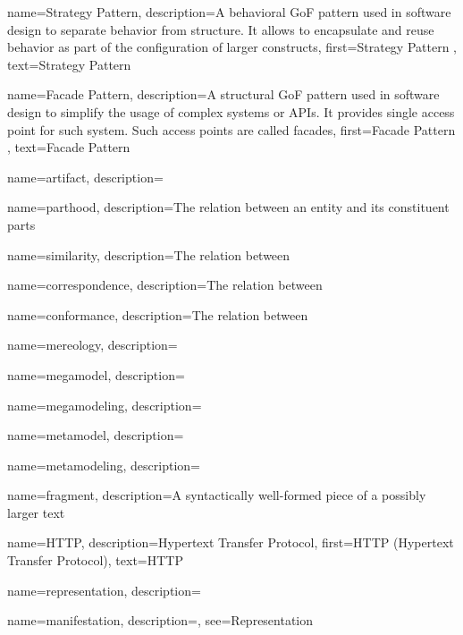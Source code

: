 {
    name={Strategy Pattern},
    description={A behavioral \gls{GoF} pattern used in software design to separate behavior from structure. It allows to encapsulate and reuse behavior as part of the configuration of larger constructs},
    first={Strategy Pattern \cite{Gamma:1995:DPE:186897}},
    text={Strategy Pattern}
}

{
    name={Facade Pattern},
    description={A structural \gls{GoF} pattern used in software design to simplify the usage of complex systems or \glspl{API}. It provides single access point for such system. Such access points are called facades},
    first={Facade Pattern \cite{Gamma:1995:DPE:186897}},
    text={Facade Pattern}
}

{
    name={artifact},
    description={}
}

{
    name={parthood},
    description={The relation between an entity and its constituent parts}
}

{
    name={similarity},
    description={The relation between }
}

{
    name={correspondence},
    description={The relation between }
}

{
    name={conformance},
    description={The relation between }
}

{
    name={mereology},
    description={}
}

{
    name={megamodel},
    description={}
}

{
    name={megamodeling},
    description={}
}

{
    name={metamodel},
    description={}
}

{
    name={metamodeling},
    description={}
}

{
    name={fragment},
    description={A syntactically well-formed piece of a possibly larger text}
}

{
    name=HTTP,
    description={Hypertext Transfer Protocol},
    first={HTTP (Hypertext Transfer Protocol)},
    text={HTTP}
}

{
    name={representation},
    description={}
}

{
    name={manifestation},
    description={},
    see={Representation}   
}

